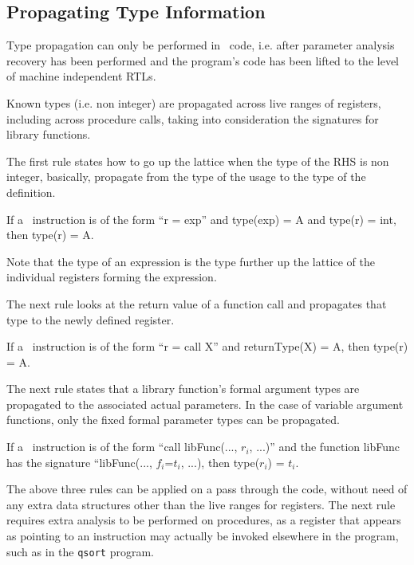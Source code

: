 \subsection{Propagating Type Information}
Type propagation can only be performed in \hrtl\ code, i.e. 
after parameter analysis recovery has been performed and 
the program's code has been lifted to the level of machine 
independent RTLs. 

Known types (i.e. non integer) are propagated across live 
ranges of registers, including across procedure calls, 
taking into consideration the signatures for library 
functions.

The first rule states how to go up the lattice when the type 
of the RHS is non integer, basically, propagate from the type of 
the usage to the type of the definition.

\begin{typerule}
If a \hrtl\ instruction is of the form ``r = exp'' and type(exp) = A 
and type(r) = int, then type(r) = A. 
\label{rule-prop-usageDef}
\end{typerule}
 
Note that the type of an expression is the type further up the
lattice of the individual registers forming the expression. 

The next rule looks at the return value of a function call 
and propagates that type to the newly defined register. 

\begin{typerule}
If a \hrtl\ instruction is of the form ``r = call X'' and 
returnType(X) = A, then type(r) = A. 
\label{rule-prop-retValue}
\end{typerule}

The next rule states that a library function's formal argument 
types are propagated to the associated actual parameters.  
In the case of variable argument functions, only the fixed 
formal parameter types can be propagated. 

\begin{typerule}
If a \hrtl\ instruction is of the form ``call libFunc(..., $r_i$, ...)'' 
and the function libFunc has the signature ``libFunc(..., $f_i$=$t_i$, ...), 
then type($r_i$) = $t_i$.  
\label{rule-prop-libFunc}
\end{typerule}
 
The above three rules can be applied on a pass through the code, 
without need of any extra data structures other than the live 
ranges for registers.  The next rule requires extra analysis to 
be performed on procedures, as a register that appears as 
pointing to an instruction may actually be invoked elsewhere in
the program, such as in the \texttt{qsort} program.  

